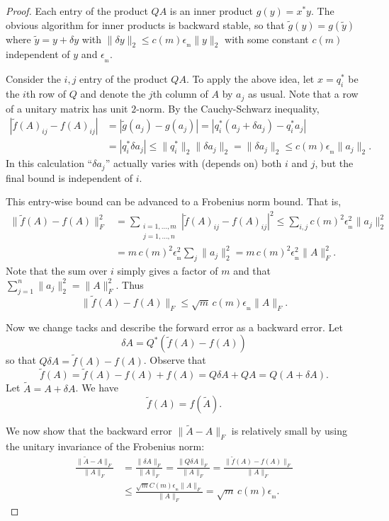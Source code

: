\documentclass[12pt]{amsart}
\newcommand{\eps}{\epsilon}
\newcommand{\ema}{\emach}
\newcommand{\emach}{\eps_{\!_{\text{m}}}}
\begin{document}
\begin{proof}
Each entry of the product $QA$ is an inner product $g(y)=x^*y$.  The obvious algorithm for inner products is backward stable, so that $\tilde g(y) = g(\tilde y)$ where $\tilde y = y + \delta y$ with $\|\delta y\|_2 \le c(m) \ema \|y\|_2$ with some constant $c(m)$ independent of $y$ and $\ema$.

Consider the $i,j$ entry of the product $QA$.  To apply the above idea, let $x = q_i^*$ be the $i$th row of $Q$ and denote the $j$th column of $A$ by $a_j$ as usual.  Note that a row of a unitary matrix has unit $2$-norm.  By the Cauchy-Schwarz inequality,
\begin{align*}
|\tilde f(A)_{ij} - f(A)_{ij}| &= |\tilde g(a_j) - g(a_j)| = |q_i^* (a_j + \delta a_j) - q_i^* a_j|\\
  &= |q_i^* \delta a_j| \le \|q_i^*\|_2 \|\delta a_j\|_2 = \|\delta a_j\|_2 \le c(m) \ema \|a_j\|_2.
\end{align*}
In this calculation ``$\delta a_j$'' actually varies with (depends on) both $i$ and $j$, but the final bound is independent of $i$.

This entry-wise bound can be advanced to a Frobenius norm bound.  That is,
\begin{align*}
\|\tilde f(A) - f(A)\|_F^2 &= \sum_{\begin{smallmatrix} i=1,\dots,m \\ j=1,\dots,n \end{smallmatrix}}|\tilde f(A)_{ij} - f(A)_{ij}|^2 \le \sum_{i,j} c(m)^2 \ema^2 \|a_j\|_2^2 \\
   &= m\, c(m)^2 \ema^2 \sum_{j} \|a_j\|_2^2 = m\, c(m)^2 \ema^2 \|A\|_F^2.
\end{align*}
Note that the sum over $i$ simply gives a factor of $m$ and that $\sum_{j=1}^n \|a_j\|_2^2 = \|A\|_F^2$.  Thus
    $$\|\tilde f(A) - f(A)\|_F \le \sqrt{m}\, c(m) \ema \|A\|_F.$$

Now we change tacks and describe the forward error as a backward error.  Let
    $$\delta A = Q^*(\tilde f(A) - f(A))$$
so that $Q \delta A = \tilde f(A) - f(A)$.  Observe that
    $$\tilde f(A) = \tilde f(A) - f(A) + f(A) = Q \delta A + QA = Q (A+\delta A).$$
Let $\tilde A=A+\delta A$.  We have
    $$\tilde f(A) = f(\tilde A).$$

We now show that the backward error $\|\tilde A - A\|_F$ is relatively small by using the unitary invariance of the Frobenius norm:
\begin{align*}
\frac{\|\tilde A - A\|_F}{\|A\|_F} &= \frac{\|\delta A\|_F}{\|A\|_F} = \frac{\|Q\delta A\|_F}{\|A\|_F} = \frac{\|\tilde f(A) - f(A)\|_F}{\|A\|_F} \\
   &\le \frac{\sqrt{m} C(m) \ema \|A\|_F}{\|A\|_F} = \sqrt{m}\, c(m) \ema.
\end{align*}
\end{proof}
\end{document}
